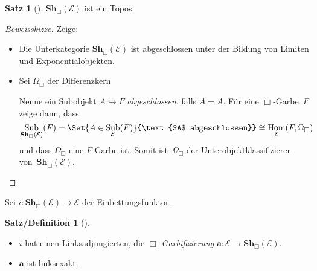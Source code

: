 \documentclass{article}
\theoremstyle{definition}
\newtheorem*{satz}{Satz}
\newtheorem*{satzdefn}{Satz/Definition}
\theoremstyle{remark}
\newcommand{\?}{\,{:}\,}
\renewcommand{\_}{\mathpunct{.}\,}
\DeclareMathOperator{\Hom}{Hom} %
\DeclareMathOperator{\id}{id} %
\DeclareMathOperator{\Sub}{Sub} %
\newcommand{\clos}[1]{\overline{{#1}}} %
\newcommand{\sheafification}{\mathbf{a}} %
\newcommand{\Sh}{\mathbf{Sh}} %
\newcommand{\Eat}{\mathcal{E}} %
\begin{document}
\begin{satz}[{\cite[V.2.5]{sigal}}]
  $\Sh_\Box(\Eat)$ ist ein Topos.
\end{satz}

\begin{proof}[Beweisskizze]
  Zeige:
  \begin{itemize}
    \item Die Unterkategorie $\Sh_\Box(\Eat)$ ist abgeschlossen unter der Bildung von Limiten und Exponentialobjekten.
    \item
      Sei $\Omega_\Box$ der Differenzkern


      Nenne ein Subobjekt $A \hookrightarrow F$ \emph{abgeschlossen}, falls $\clos{A} = A$.
      Für eine $\Box$-Garbe~$F$ zeige dann, dass
      \[
        \Sub_{\Sh_\Box(\Eat)}(F) =
        \Set{A \in \Sub_\Eat(F)}{\text{$A$ abgeschlossen}} \cong
        \Hom_\Eat(F, \Omega_\Box)
      \]
      und dass $\Omega_\Box$ eine $F$-Garbe ist.
      Somit ist~$\Omega_\Box$ der Unterobjektklassifizierer von~$\Sh_\Box(\Eat)$. \qedhere
  \end{itemize}
\end{proof}

Sei $i : \Sh_\Box(\Eat) \to \Eat$ der Einbettungsfunktor.

\begin{satzdefn}[{\cite[V.3.1]{sigal}}]
  \begin{minipage}[t]{0.99 \linewidth}
    \begin{itemize}
      \item $i$ hat einen Linksadjungierten, die \emph{$\Box$-Garbifizierung} $\sheafification : \Eat \to \Sh_\Box(\Eat)$.
      \item $\sheafification$ ist linksexakt.
    \end{itemize}
  \end{minipage}
\end{satzdefn}
\end{document}
